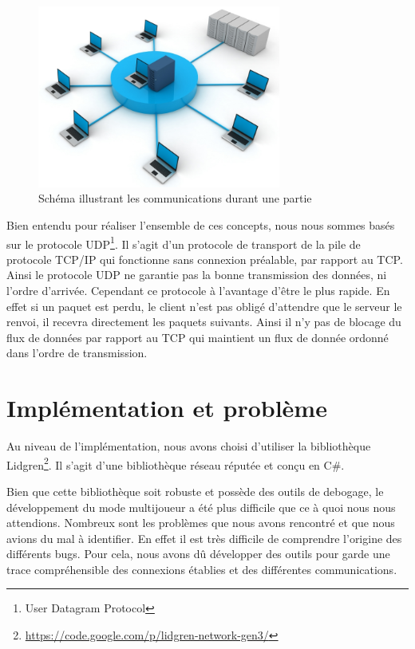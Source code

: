 \documentclass[11pt]{report}
\begin{document}
\begin{figure}[htbp]
\centering
\includegraphics[width=8cm]{reseau.jpg}
\caption{Schéma illustrant les communications durant une partie}
\label{reseau}
\end{figure}

Bien entendu pour réaliser l'ensemble de ces concepts, nous nous sommes basés sur le protocole UDP\footnote{User Datagram Protocol}. Il s'agit d'un protocole de transport de la pile de protocole TCP/IP qui fonctionne sans connexion préalable, par rapport au TCP. Ainsi le protocole UDP ne garantie pas la bonne transmission des données, ni l'ordre d'arrivée. Cependant ce protocole à l'avantage d'être le plus rapide. En effet si un paquet est perdu, le client n'est pas obligé d'attendre que le serveur le renvoi, il recevra directement les paquets suivants. Ainsi il n'y pas de blocage du flux de données par rapport au TCP qui maintient un flux de donnée ordonné dans l'ordre de transmission.

\section{Implémentation et problème}

Au niveau de l'implémentation, nous avons choisi d'utiliser la bibliothèque Lidgren\footnote{\url{https://code.google.com/p/lidgren-network-gen3/}}. Il s'agit d'une bibliothèque réseau réputée et conçu en C\#.

Bien que cette bibliothèque soit robuste et possède des outils de debogage, le développement du mode multijoueur a été plus difficile que ce à quoi nous nous attendions. Nombreux sont les problèmes que nous avons rencontré et que nous avions du mal à identifier. En effet il est très difficile de comprendre l'origine des différents bugs. Pour cela, nous avons dû développer des outils pour garde une trace compréhensible des connexions établies et des différentes communications.
\end{document}
